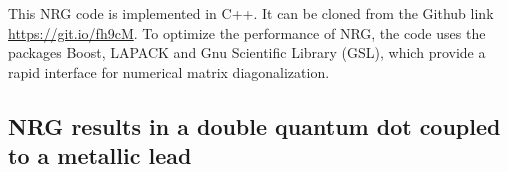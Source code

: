  This NRG code is implemented in C++. It can be cloned from the Github link \url{https://git.io/fh9cM}.  To optimize the performance of NRG, the code uses the packages Boost, LAPACK and Gnu Scientific Library (GSL), which provide a rapid interface for numerical matrix diagonalization. 
 









\subsection{NRG results in a double quantum dot coupled to a metallic lead\label{sec: NRG-DQD}}

